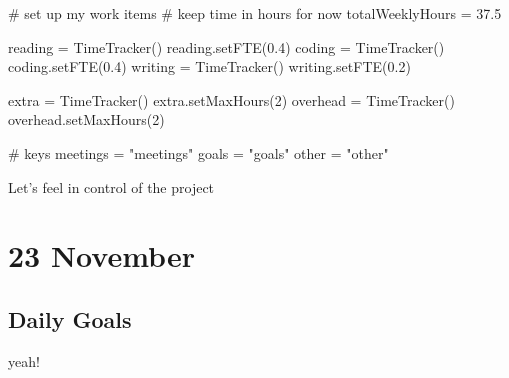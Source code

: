 \documentclass[weekly_log.tex]{subfiles}
\begin{document}

\begin{sagesilent}
    # set up my work items 
    # keep time in hours for now
    totalWeeklyHours = 37.5

    reading  = TimeTracker()
    reading.setFTE(0.4)
    coding   = TimeTracker()
    coding.setFTE(0.4)
    writing  = TimeTracker()
    writing.setFTE(0.2)

    extra    = TimeTracker()
    extra.setMaxHours(2)
    overhead = TimeTracker()
    overhead.setMaxHours(2)

    # keys
    meetings = "meetings"
    goals  = "goals"
    other = "other"
\end{sagesilent}


Let's feel in control of the project


\section{23 November}

\subsection{Daily Goals}
\begin{todolist}
    \item[\done] yeah!
\end{todolist}


\begin{verbatim}
\end{verbatim}

\end{document}
